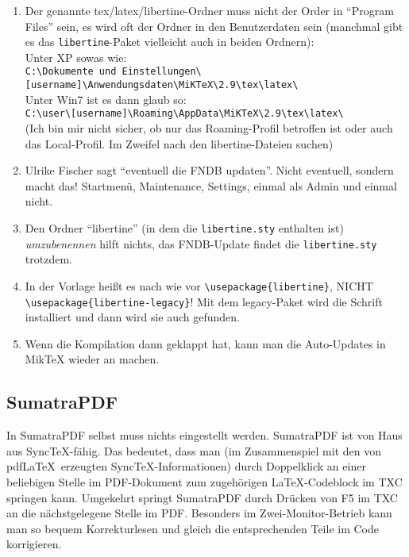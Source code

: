 \begin{enumerate}
	\item Der genannte tex/latex/libertine-Ordner muss nicht der Order in \enquote{Program Files} sein, es wird oft der Ordner in den Benutzerdaten sein (manchmal gibt es das \texttt{libertine}-Paket vielleicht auch in beiden Ordnern):\\
	Unter XP sowas wie:\\
	{\tiny \verb+C:\Dokumente und Einstellungen\[username]\Anwendungsdaten\MiKTeX\2.9\tex\latex\+ }\\
	Unter Win7 ist es dann glaub so:\\
	{\scriptsize \verb+C:\user\[username]\Roaming\AppData\MiKTeX\2.9\tex\latex\+} \\
	(Ich bin mir nicht sicher, ob nur das Roaming-Profil betroffen ist oder auch das Local-Profil. Im Zweifel nach den libertine-Dateien suchen)\\
	
	\item Ulrike Fischer sagt \enquote{eventuell die FNDB updaten}. Nicht eventuell, sondern macht das! Startmenü, Maintenance, Settings, einmal als Admin und einmal nicht.
	\item Den Ordner \enquote{libertine} (in dem die \texttt{libertine.sty} enthalten ist) \emph{umzubenennen} hilft nichts, das FNDB-Update findet die \texttt{libertine.sty} trotzdem.
	\item In der Vorlage heißt es nach wie vor \verb+\usepackage{libertine}+, NICHT \verb+\usepackage{libertine-legacy}+! Mit dem legacy-Paket wird die Schrift installiert und dann wird sie auch gefunden.
	\item Wenn die Kompilation dann geklappt hat, kann man die Auto-Updates in MikTeX wieder an machen.
\end{enumerate}


\subsection{SumatraPDF}
In SumatraPDF selbst muss nichts eingestellt werden. SumatraPDF ist von Haus aus Sync\TeX-fähig. Das bedeutet, dass man (im Zusammenspiel mit den von pdf\LaTeX\ erzeugten Sync\TeX-Informationen) durch Doppelklick an einer beliebigen Stelle im PDF-Dokument zum zugehörigen \LaTeX-Codeblock im TXC springen kann. Umgekehrt springt SumatraPDF durch Drücken von F5 im TXC an die nächstgelegene Stelle im PDF. Besonders im Zwei-Monitor-Betrieb kann man so bequem Korrekturlesen und gleich die entsprechenden Teile im Code korrigieren.


